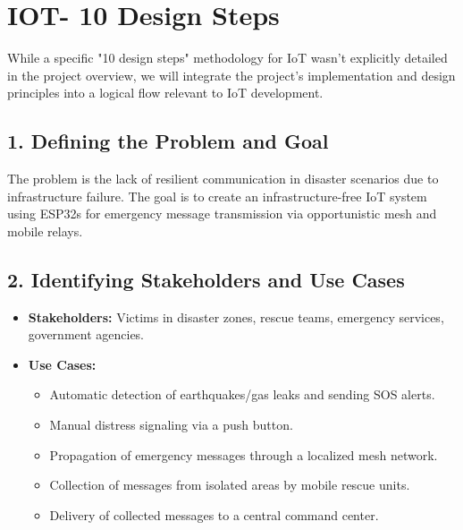\documentclass[12pt, a4paper]{article}
\begin{document}
\section{IOT- 10 Design Steps} 
While a specific "10 design steps" methodology for IoT wasn't explicitly detailed in the project overview, we will integrate the project's implementation and design principles into a logical flow relevant to IoT development.

\subsection{1. Defining the Problem and Goal}
The problem is the lack of resilient communication in disaster scenarios due to infrastructure failure. The goal is to create an infrastructure-free IoT system using ESP32s for emergency message transmission via opportunistic mesh and mobile relays.

\subsection{2. Identifying Stakeholders and Use Cases}
\begin{itemize}
    \item \textbf{Stakeholders:} Victims in disaster zones, rescue teams, emergency services, government agencies.
    \item \textbf{Use Cases:}
        \begin{itemize}
            \item Automatic detection of earthquakes/gas leaks and sending SOS alerts.
            \item Manual distress signaling via a push button.
            \item Propagation of emergency messages through a localized mesh network.
            \item Collection of messages from isolated areas by mobile rescue units.
            \item Delivery of collected messages to a central command center.
        \end{itemize}
\end{itemize}
\end{document}
